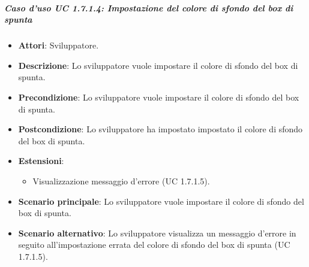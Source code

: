 \subparagraph{Caso d'uso UC 1.7.1.4: Impostazione del colore di sfondo del box di spunta}

\FloatBarrier
\begin{itemize}
\item\textbf{Attori}: Sviluppatore.
\item\textbf{Descrizione}: Lo sviluppatore vuole impostare il colore di sfondo del box di spunta.
\item\textbf{Precondizione}: Lo sviluppatore vuole impostare il colore di sfondo del box di spunta.
\item\textbf{Postcondizione}: Lo sviluppatore ha impostato impostato il colore di sfondo del box di spunta.
\item \textbf{Estensioni}: 
\begin{itemize}
\item Visualizzazione messaggio d'errore (UC 1.7.1.5).
\end{itemize}
\item\textbf{Scenario principale}: Lo sviluppatore vuole impostare il colore di sfondo del box di spunta.
\item\textbf{Scenario alternativo}: Lo sviluppatore visualizza un messaggio d'errore in seguito all'impostazione errata del colore di sfondo del box di spunta (UC 1.7.1.5).
\end{itemize}